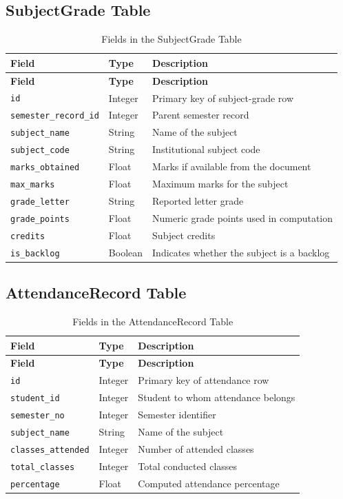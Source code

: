 \subsection{SubjectGrade Table}
\begin{longtable}{p{}p{}p{}}
\caption{Fields in the SubjectGrade Table}\\
\toprule
\textbf{Field} & \textbf{Type} & \textbf{Description} \\
\midrule
\endfirsthead
\toprule
\textbf{Field} & \textbf{Type} & \textbf{Description} \\
\midrule
\endhead
\texttt{id} & Integer & Primary key of subject-grade row \\
\texttt{semester\_record\_id} & Integer & Parent semester record \\
\texttt{subject\_name} & String & Name of the subject \\
\texttt{subject\_code} & String & Institutional subject code \\
\texttt{marks\_obtained} & Float & Marks if available from the document \\
\texttt{max\_marks} & Float & Maximum marks for the subject \\
\texttt{grade\_letter} & String & Reported letter grade \\
\texttt{grade\_points} & Float & Numeric grade points used in computation \\
\texttt{credits} & Float & Subject credits \\
\texttt{is\_backlog} & Boolean & Indicates whether the subject is a backlog \\
\bottomrule
\end{longtable}

\subsection{AttendanceRecord Table}
\begin{longtable}{p{}p{}p{}}
\caption{Fields in the AttendanceRecord Table}\\
\toprule
\textbf{Field} & \textbf{Type} & \textbf{Description} \\
\midrule
\endfirsthead
\toprule
\textbf{Field} & \textbf{Type} & \textbf{Description} \\
\midrule
\endhead
\texttt{id} & Integer & Primary key of attendance row \\
\texttt{student\_id} & Integer & Student to whom attendance belongs \\
\texttt{semester\_no} & Integer & Semester identifier \\
\texttt{subject\_name} & String & Name of the subject \\
\texttt{classes\_attended} & Integer & Number of attended classes \\
\texttt{total\_classes} & Integer & Total conducted classes \\
\texttt{percentage} & Float & Computed attendance percentage \\
\bottomrule
\end{longtable}

